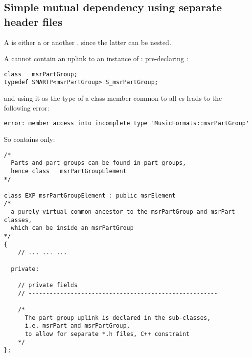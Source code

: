 \subsection{Simple mutual dependency using separate header files}

A  is either a  or another , since the latter can be nested.

A  cannot contain an uplink to an instance of : pre-declaring :
\begin{lstlisting}[language=CPlusPlus]
class   msrPartGroup;
typedef SMARTP<msrPartGroup> S_msrPartGroup;
\end{lstlisting}

and using it as the type of a class member common to all  \subClass es leads to the following error:
\begin{lstlisting}[language=Terminal]
error: member access into incomplete type 'MusicFormats::msrPartGroup'
\end{lstlisting}

So  contains only:
\begin{lstlisting}[language=CPlusPlus]
/*
  Parts and part groups can be found in part groups,
  hence class   msrPartGroupElement
*/

class EXP msrPartGroupElement : public msrElement
/*
  a purely virtual common ancestor to the msrPartGroup and msrPart classes,
  which can be inside an msrPartGroup
*/
{
	// ... ... ...

  private:

    // private fields
    // ------------------------------------------------------

    /*
      The part group uplink is declared in the sub-classes,
      i.e. msrPart and msrPartGroup,
      to allow for separate *.h files, C++ constraint
    */
};
\end{lstlisting}

